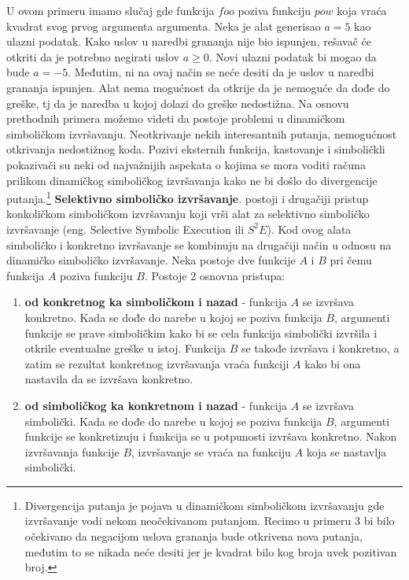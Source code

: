 \documentclass[12pt]{article}
\begin{document}
U ovom primeru imamo slučaj gde funkcija $foo$ poziva funkciju $pow$ koja vraća kvadrat svog prvog argumenta argumenta. Neka je alat generisao $a = 5$ kao ulazni podatak. Kako uslov u naredbi grananja nije bio ispunjen, rešavač će otkriti da je potrebno negirati uslov $a \geq 0$. Novi ulazni podatak bi mogao da bude $a = -5$. Međutim, ni na ovaj način se neće desiti da je uslov u naredbi grananja ispunjen. Alat nema mogućnost da otkrije da je nemoguće da dođe do greške, tj da je naredba u kojoj dolazi do greške nedostižna. 
Na osnovu prethodnih primera možemo videti da postoje problemi u dinamičkom simboličkom izvršavanju. Neotkrivanje nekih interesantnih putanja, nemogućnost otkrivanja nedostižnog koda. Pozivi eksternih funkcija, kastovanje i simboličkli pokazivači su neki od najvažnijih aspekata o kojima se mora voditi računa prilikom dinamičkog simboličkog izvršavanja kako ne bi došlo do divergencije putanja.\footnote[1]{Divergencija putanja je pojava u dinamičkom simboličkom izvršavanju gde izvršavanje vodi nekom neočekivanom putanjom. Recimo u primeru 3 bi bilo očekivano da negacijom uslova grananja bude otkrivena nova putanja, međutim to se nikada neće desiti jer je kvadrat bilo kog broja uvek pozitivan broj.}
\newline
\newline
\textbf{Selektivno simboličko izvršavanje}. postoji i drugačiji pristup konkoličkom simboličkom  izvršavanju koji vrši alat za selektivno simboličko izvršavanje (eng. Selective Symbolic Execution ili $S^2E$). Kod ovog alata simboličko i konkretno izvršavanje se kombinuju na drugačiji način u odnosu na dinamičko simboličko izvršavanje. Neka postoje dve funkcije $A$ i $B$ pri čemu funkcija $A$ poziva funkciju $B$.
Postoje 2 osnovna pristupa:
\begin{enumerate}
    \item \textbf{od konkretnog ka simboličkom i nazad} - funkcija $A$ se izvršava konkretno. Kada se dođe do narebe u kojoj se poziva funkcija $B$, argumenti funkcije se prave simboličkim kako bi se cela funkcija simbolički izvršila i otkrile eventualne greške u istoj. Funkcija $B$ se takođe izvršava i konkretno, a zatim se rezultat konkretnog izvršavanja vraća funkciji $A$ kako bi ona nastavila da se izvršava konkretno.
    
    \item \textbf{od simboličkog ka konkretnom i nazad} - funkcija $A$ se izvršava simbolički. Kada se dođe do narebe u kojoj se poziva funkcija $B$, argumenti funkcije se konkretizuju i funkcija se u potpunosti izvršava konkretno. Nakon izvršavanja funkcije $B$, izvršavanje se vraća na funkciju $A$ koja se nastavlja simbolički.
\end{enumerate}
\end{document}
